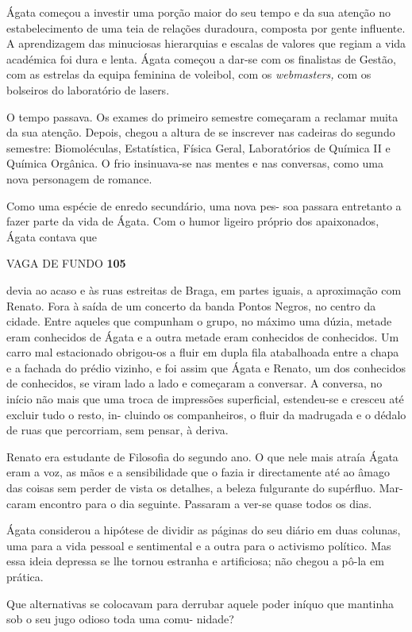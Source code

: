 Ágata começou a investir uma porção maior do seu tempo e da sua atenção
no estabelecimento de uma teia de relações duradoura, composta por gente
influente. A aprendizagem das minuciosas hierarquias e escalas de
valores que regiam a vida académica foi dura e lenta. Ágata começou a
dar-se com os finalistas de Gestão, com as estrelas da equipa feminina
de voleibol, com os \emph{webmasters, }com os bolseiros do laboratório
de lasers.

O tempo passava. Os exames do primeiro semestre começaram a reclamar
muita da sua atenção. Depois, chegou a altura de se inscrever nas
cadeiras do segundo semestre: Biomoléculas, Estatística, Física Geral,
Laboratórios de Química II e Química Orgânica. O frio insinuava-se nas
mentes e nas conversas, como uma nova personagem de romance.

Como uma espécie de enredo secundário, uma nova pes- soa passara
entretanto a fazer parte da vida de Ágata. Com o humor ligeiro próprio
dos apaixonados, Ágata contava que

VAGA DE FUNDO \textbf{105}

devia ao acaso e às ruas estreitas de Braga, em partes iguais, a
aproximação com Renato. Fora à saída de um concerto da banda Pontos
Negros, no centro da cidade. Entre aqueles que compunham o grupo, no
máximo uma dúzia, metade eram conhecidos de Ágata e a outra metade eram
conhecidos de conhecidos. Um carro mal estacionado obrigou-os a fluir em
dupla fila atabalhoada entre a chapa e a fachada do prédio vizinho, e
foi assim que Ágata e Renato, um dos conhecidos de conhecidos, se viram
lado a lado e começaram a conversar. A conversa, no início não mais que
uma troca de impressões superficial, estendeu-se e cresceu até excluir
tudo o resto, in- cluindo os companheiros, o fluir da madrugada e o
dédalo de ruas que percorriam, sem pensar, à deriva.

Renato era estudante de Filosofia do segundo ano. O que nele mais atraía
Ágata eram a voz, as mãos e a sensibilidade que o fazia ir directamente
até ao âmago das coisas sem perder de vista os detalhes, a beleza
fulgurante do supérfluo. Mar- caram encontro para o dia seguinte.
Passaram a ver-se quase todos os dias.

Ágata considerou a hipótese de dividir as páginas do seu diário em duas
colunas, uma para a vida pessoal e sentimental e a outra para o
activismo político. Mas essa ideia depressa se lhe tornou estranha e
artificiosa; não chegou a pô-la em prática.

Que alternativas se colocavam para derrubar aquele poder iníquo que
mantinha sob o seu jugo odioso toda uma comu- nidade?

